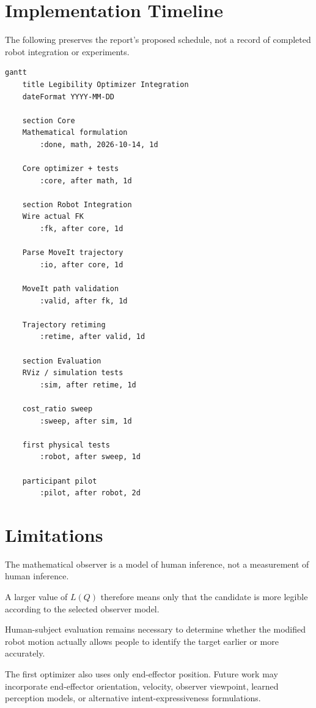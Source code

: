 \documentclass[11pt]{article}
\begin{document}
\section{Implementation Timeline}

The following preserves the report's proposed schedule, not a record of
completed robot integration or experiments.

\begin{lstlisting}
gantt
    title Legibility Optimizer Integration
    dateFormat YYYY-MM-DD

    section Core
    Mathematical formulation
        :done, math, 2026-10-14, 1d

    Core optimizer + tests
        :core, after math, 1d

    section Robot Integration
    Wire actual FK
        :fk, after core, 1d

    Parse MoveIt trajectory
        :io, after core, 1d

    MoveIt path validation
        :valid, after fk, 1d

    Trajectory retiming
        :retime, after valid, 1d

    section Evaluation
    RViz / simulation tests
        :sim, after retime, 1d

    cost_ratio sweep
        :sweep, after sim, 1d

    first physical tests
        :robot, after sweep, 1d

    participant pilot
        :pilot, after robot, 2d
\end{lstlisting}

\section{Limitations}

The mathematical observer is a model of human inference, not a
measurement of human inference.

A larger value of $L(Q)$ therefore means only that the candidate
is more legible according to the selected observer model.

Human-subject evaluation remains necessary to determine whether
the modified robot motion actually allows people to identify the
target earlier or more accurately.

The first optimizer also uses only end-effector position.
Future work may incorporate end-effector orientation, velocity,
observer viewpoint, learned perception models, or alternative
intent-expressiveness formulations.
\end{document}
